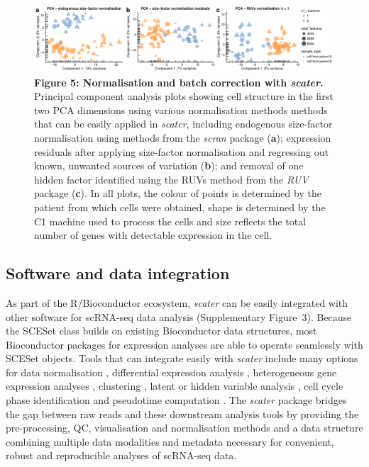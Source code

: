 \documentclass{bioinfo}
\begin{document}
\begin{figure}[!tpb]%
\centerline{\includegraphics[width=\textwidth]{figures/figure5.pdf}}
\caption{\textbf{Figure 5: Normalisation and batch correction with
\emph{scater}.} Principal component analysis plots showing cell
structure in the first two PCA dimensions using various normalisation
methods methods that can be easily applied in \emph{scater}, including
endogenous size-factor normalisation using methods from the \emph{scran}
package (\textbf{a}); expression residuals after applying size-factor
normalisation and regressing out known, unwanted sources of variation
(\textbf{b}); and removal of one hidden factor identified using
the RUVs method from the \emph{RUV} package (\textbf{c}). In all plots,
the colour of points is determined by the patient from which cells were
obtained, shape is determined by the C1 machine used to process the
cells and size reflects the total number of genes with detectable
expression in the cell.}\label{fig:05}
\end{figure}


\subsection{Software and data integration}\label{software-and-data-integration}

As part of the R/Bioconductor ecosystem, \emph{scater} can be easily
integrated with other software for scRNA-seq data analysis (Supplementary Figure~3). Because the
SCESet class builds on existing Bioconductor data structures, most
Bioconductor packages for expression analyses are able to operate
seamlessly with SCESet objects. Tools that can integrate easily with
\emph{scater} include many options for data normalisation
\citep{Lun2016-sk,Vallejos2015-ww,Ding2015-jv}, differential expression analysis
\citep{Vallejos2016-qy,Trapnell2014-gj,Finak2015-rd,Vu2016-sk,Kharchenko2014-rx,Korthauer2015-wg,Andrews2016-at}, heterogeneous gene expression analyses
\citep{Vallejos2015-ww}, clustering
\citep{Kiselev2016-fu,Guo2015-wx,Fan2016-wh,Grun2015-fy}, latent or hidden
variable analysis
\citep{Leek2014-nu,Risso2014-np,Stegle2012-is,Chikina2015-lq},
cell cycle phase identification \citep{Scialdone2015-gj} and pseudotime
computation \citep{Trapnell2014-gj,Angerer2015-sw,Julia2015-jt,Campbell2016-es,Campbell2015-nj,Haghverdi2016-is}. The \emph{scater} package bridges
the gap between raw reads and these downstream analysis tools by providing the
pre-processing, QC, visualisation and normalisation methods and a data
structure combining multiple data modalities and metadata necessary for
convenient, robust and reproducible analyses of scRNA-seq data.
\end{document}

